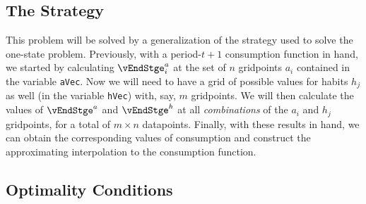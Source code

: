 \documentclass[titlepage, headings=optiontotocandhead]{\econtex}
\begin{document}
{  \hypertarget{The-Strategy}{}
  \subsection{The Strategy}

  This problem will be solved by a generalization of the strategy used
  to solve the one-state problem.  Previously, with a period-$t+1$
  consumption function in hand, we started by calculating
  $\vEndStge^{{a}}_{i}$ at the set of $n$ gridpoints ${a}_{i}$
  contained in the variable \texttt{aVec}.  Now we will need to
  have a grid of possible values for habits $h_{j}$ as well (in the
  variable \texttt{hVec}) with, say, $m$ gridpoints.  We will then
  calculate the values of $\vEndStge^{{a}}$ and $\vEndStge^{h}$
  at all \textit{combinations} of the ${a}_{i}$ and $h_{j}$
  gridpoints, for a total of $m \times n$ datapoints.  Finally, with
  these results in hand, we can obtain the corresponding values of
  consumption and construct the approximating interpolation to the
  consumption function.

  \hypertarget{Optimality-Conditions}{}
  \subsection{Optimality Conditions}
  \hypertarget{The-First-Orrder-Condition-for-c}{}
}
\end{document}
